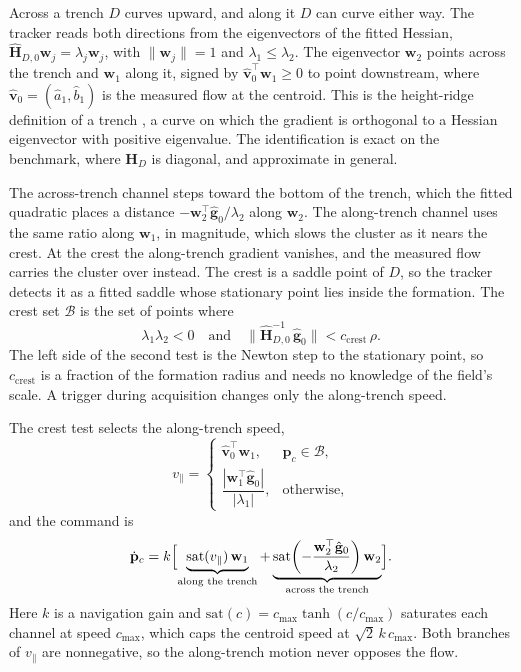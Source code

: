 \documentclass[lettersize,journal]{IEEEtran}
\begin{document}
Across a trench $D$ curves upward, and along it $D$ can curve either way.
The tracker reads both directions from the eigenvectors of the fitted
Hessian, $\hat{\mathbf{H}}_{D,0}\mathbf{w}_j = \lambda_j \mathbf{w}_j$,
with $\|\mathbf{w}_j\| = 1$ and $\lambda_1 \leq \lambda_2$. The
eigenvector $\mathbf{w}_2$ points across the trench and $\mathbf{w}_1$
along it, signed by $\hat{\mathbf{v}}_0^\top \mathbf{w}_1 \geq 0$ to point
downstream, where $\hat{\mathbf{v}}_0 = (\hat{a}_1, \hat{b}_1)$ is the
measured flow at the centroid. This is the height-ridge definition of a
trench \cite{33}, a curve on which the gradient is orthogonal to a Hessian
eigenvector with positive eigenvalue. The identification is exact on the
benchmark, where $\mathbf{H}_D$ is diagonal, and approximate in general.

The across-trench channel steps toward the bottom of the trench, which
the fitted quadratic places a distance
$-\mathbf{w}_2^\top\hat{\mathbf{g}}_0/\lambda_2$ along $\mathbf{w}_2$. The
along-trench channel uses the same ratio along $\mathbf{w}_1$, in
magnitude, which slows the cluster as it nears the crest.
At the crest the along-trench gradient vanishes, and the measured flow
carries the cluster over instead. The crest is a saddle point of $D$, so
the tracker detects it as a fitted saddle whose stationary point lies
inside the formation. The crest set $\mathcal{B}$ is the set of points
where
\begin{equation}
    \lambda_1\lambda_2 < 0
    \quad\text{and}\quad
    \bigl\|\hat{\mathbf{H}}_{D,0}^{-1}\,\hat{\mathbf{g}}_0\bigr\|
        < c_{\mathrm{crest}}\,\rho.
    \label{eq:band}
\end{equation}
The left side of the second test is the Newton step to the stationary
point, so $c_{\mathrm{crest}}$ is a fraction of the formation radius and
needs no knowledge of the field's scale. A trigger during acquisition
changes only the along-trench speed.

The crest test selects the along-trench speed,
\begin{equation}
    v_\parallel =
    \begin{cases}
        \hat{\mathbf{v}}_0^\top \mathbf{w}_1,
            & \mathbf{p}_c \in \mathcal{B}, \\[6pt]
        \dfrac{|\mathbf{w}_1^\top \hat{\mathbf{g}}_0|}{|\lambda_1|},
            & \text{otherwise},
    \end{cases}
    \label{eq:vpar}
\end{equation}
and the command is
\begin{equation}
    \dot{\mathbf{p}}_c = k\Bigl[
    \underbrace{\mathrm{sat}(v_\parallel)\,\mathbf{w}_1}_{\text{along the trench}}
    + \underbrace{\mathrm{sat}\!\left(-\frac{\mathbf{w}_2^\top
      \hat{\mathbf{g}}_0}{\lambda_2}\right)\mathbf{w}_2}_{\text{across the trench}}\Bigr].
    \label{eq:d_law}
\end{equation}
Here $k$ is a navigation gain and
$\mathrm{sat}(c) = c_{\max}\tanh(c/c_{\max})$ saturates each channel at
speed $c_{\max}$, which caps the centroid speed at $\sqrt{2}\,k\,c_{\max}$.
Both branches of $v_\parallel$ are nonnegative, so the along-trench
motion never opposes the flow.
\end{document}

